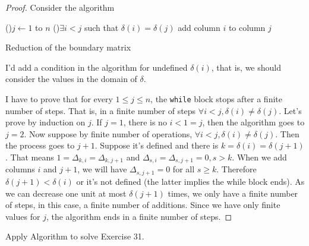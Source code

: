 \begin{proof}

Consider the algorithm

\begin{algorithm}[H]
    \SetAlgoLined
     \For(){$j \leftarrow 1$ to $n$}{
        \While(){$\exists i < j$ such that $\delta(i) = \delta(j)$}{
            add column $i$ to column $j$
        }
     }
     \caption{Reduction of the boundary matrix}
    \end{algorithm}

\begin{remark}
    I'd add a condition in the algorithm for undefined $\delta(i)$, that is,
    we should consider the values in the domain of $\delta$.
\end{remark}

I have to prove that for every $1 \le j \le n$, the \texttt{while} block stops
after a finite number of steps. That is, in a finite number of steps $\forall
i < j, \delta(i) \neq \delta(j)$. Let's prove by induction on $j$. If $j = 1$,
there is no $i < 1 = j$, then the algorithm goes to $j = 2$. Now suppose by
finite number of operations, $\forall i < j, \delta(i) \neq \delta(j)$. Then
the process goes to $j+1$. Suppose it's defined and there is $k = \delta(i) =
\delta(j+1)$. That means $1 = \Delta_{k,i} =
\Delta_{k,j+1}$ and $\Delta_{s,i} = \Delta_{s,j+1}=0, s > k$. When we add
columns $i$ and $j+1$, we will have $\Delta_{s,j+1} = 0$ for all $s \ge k$.
Therefore $\delta(j+1) < \delta(i)$ or it's not defined (the latter implies
the while block ends). As we can decrease one unit at most $\delta(j+1)$
times, we only have a finite number of steps, in this case, a finite number of
additions. Since we have only finite values for $j$, the algorithm ends in a finite number of steps. 

\end{proof}

\noindent\linia 

\begin{exercise}
    Apply Algorithm to solve Exercise 31.
\end{exercise}

